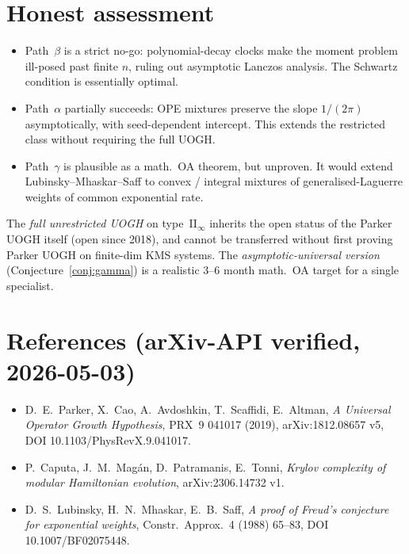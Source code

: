 \documentclass[11pt]{amsart}
\theoremstyle{remark}
\begin{document}
\section{Honest assessment}

\begin{itemize}
\item Path~$\beta$ is a strict no-go: polynomial-decay clocks make the moment
problem ill-posed past finite $n$, ruling out asymptotic Lanczos analysis.
The Schwartz condition is essentially optimal.
\item Path~$\alpha$ partially succeeds: OPE mixtures preserve the slope $1/(2\pi)$
asymptotically, with seed-dependent intercept. This extends the restricted
class without requiring the full UOGH.
\item Path~$\gamma$ is plausible as a math.\ OA theorem, but
unproven. It would extend Lubinsky--Mhaskar--Saff to convex / integral mixtures
of generalised-Laguerre weights of common exponential rate.
\end{itemize}

\noindent The \emph{full unrestricted UOGH} on type~II$_\infty$ inherits the
open status of the Parker UOGH itself (open since 2018), and cannot be transferred
without first proving Parker UOGH on finite-dim KMS systems. The
\emph{asymptotic-universal version} (Conjecture~\ref{conj:gamma}) is a
realistic 3--6 month math.\ OA target for a single specialist.

\section{References (arXiv-API verified, 2026-05-03)}

\begin{itemize}
\item D.~E.~Parker, X.~Cao, A.~Avdoshkin, T.~Scaffidi, E.~Altman,
  \emph{A Universal Operator Growth Hypothesis}, PRX~9 041017 (2019),
  arXiv:1812.08657 v5, DOI 10.1103/PhysRevX.9.041017.
\item P.~Caputa, J.~M.~Mag\'an, D.~Patramanis, E.~Tonni,
  \emph{Krylov complexity of modular Hamiltonian evolution},
  arXiv:2306.14732 v1.
\item D.~S.~Lubinsky, H.~N.~Mhaskar, E.~B.~Saff,
  \emph{A proof of Freud's conjecture for exponential weights},
  Constr.\ Approx.\ 4 (1988) 65--83, DOI 10.1007/BF02075448.
\end{itemize}
\end{document}
